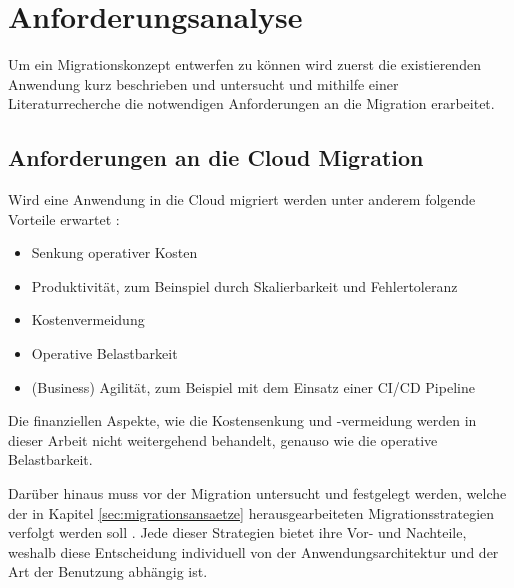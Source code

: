 \section{Anforderungsanalyse}
\label{sec:anforderungsanalyse}


Um ein Migrationskonzept entwerfen zu können wird zuerst die existierenden Anwendung kurz beschrieben und untersucht und mithilfe einer Literaturrecherche die notwendigen Anforderungen an die Migration erarbeitet.

\subsection{Anforderungen an die Cloud Migration}
Wird eine Anwendung in die Cloud migriert werden unter anderem folgende Vorteile erwartet \cite[Vgl. auch im Folgenden][03:23-05:36min]{AWS2019}:
\begin{itemize}
\item Senkung operativer Kosten
\item Produktivität, zum Beinspiel durch Skalierbarkeit und Fehlertoleranz
\item Kostenvermeidung
\item Operative Belastbarkeit
\item (Business) Agilität, zum Beispiel mit dem Einsatz einer CI/CD Pipeline
\end{itemize}

Die finanziellen Aspekte, wie die Kostensenkung und -vermeidung werden in dieser Arbeit nicht weitergehend behandelt, genauso wie die operative Belastbarkeit.

Darüber hinaus muss vor der Migration untersucht und festgelegt werden, welche der in Kapitel \ref{sec:migrationsansaetze} herausgearbeiteten Migrationsstrategien verfolgt werden soll \cite[Vgl.][10:38-13:23min]{AWS2019}. Jede dieser Strategien bietet ihre Vor- und Nachteile, weshalb diese Entscheidung individuell von der Anwendungsarchitektur und der Art der Benutzung abhängig ist. \pagebreak

